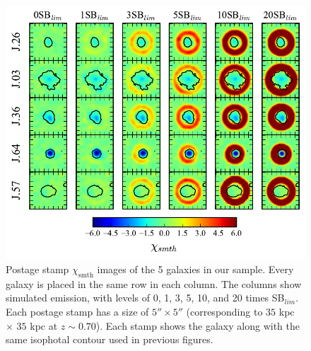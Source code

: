\documentclass[twocolumn]{aastex61}
\begin{document}
\begin{figure}[p]
\centering
\includegraphics[scale=1.2]{../Figures/sigmas.pdf}
\caption{Postage stamp $\chi_{\text{smth}}$ images of the 5 galaxies in our sample. Every galaxy is placed in the same row in each column. The columns show simulated emission, with levels of 0, 1, 3, 5, 10, and 20 times SB$_{lim}$.  Each postage stamp has a size of $5'' \times 5''$ (corresponding to $35$ kpc $\times$ $35$ kpc at $z\sim 0.70$). Each stamp shows the galaxy along with the same isophotal contour used in previous figures.}
\label{fig:sigmas}
\end{figure}
\end{document}
